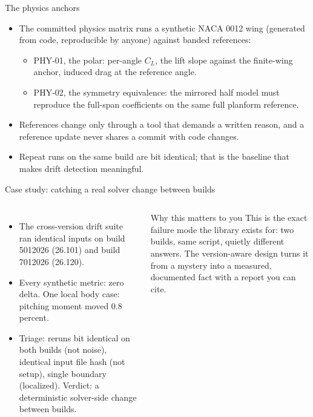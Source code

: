 \documentclass[aspectratio=169,10pt]{beamer}
\begin{document}
\begin{frame}{The physics anchors}
  \begin{itemize}
    \item The committed physics matrix runs a synthetic NACA 0012 wing (generated from code, reproducible by anyone) against banded references:
    \begin{itemize}
      \item PHY-01, the polar: per-angle $C_L$, the lift slope against the finite-wing anchor, induced drag at the reference angle.
      \item PHY-02, the symmetry equivalence: the mirrored half model must reproduce the full-span coefficients on the same full planform reference.
    \end{itemize}
    \item References change only through a tool that demands a written reason, and a reference update never shares a commit with code changes.
    \item Repeat runs on the same build are bit identical; that is the baseline that makes drift detection meaningful.
  \end{itemize}
\end{frame}

\begin{frame}{Case study: catching a real solver change between builds}
  \begin{columns}[T]
    \begin{itemize}
      \item The cross-version drift suite ran identical inputs on build 5012026 (26.101) and build 7012026 (26.120).
      \item Every synthetic metric: zero delta. One local body case: pitching moment moved 0.8 percent.
      \item Triage: reruns bit identical on both builds (not noise), identical input file hash (not setup), single boundary (localized). Verdict: a deterministic solver-side change between builds.
    \end{itemize}
    \begin{block}{Why this matters to you}
      This is the exact failure mode the library exists for: two builds, same script, quietly different answers. The version-aware design turns it from a mystery into a measured, documented fact with a report you can cite.
    \end{block}
  \end{columns}
\end{frame}
\end{document}
